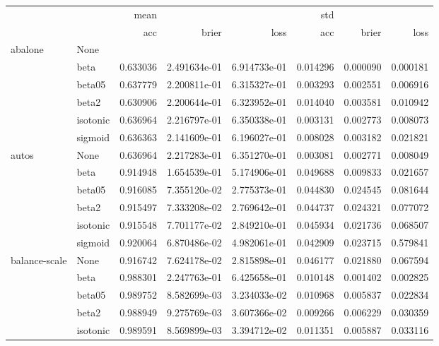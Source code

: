 \begin{tabular}{llrrrrrr}
\toprule
        &      &      mean &               &               &       std &           &           \\
        &      &       acc &         brier &          loss &       acc &     brier &      loss \\
\midrule
abalone & None &           &               &               &           &           &           \\
        & beta &  0.633036 &  2.491634e-01 &  6.914733e-01 &  0.014296 &  0.000090 &  0.000181 \\
        & beta05 &  0.637779 &  2.200811e-01 &  6.315327e-01 &  0.003293 &  0.002551 &  0.006916 \\
        & beta2 &  0.630906 &  2.200644e-01 &  6.323952e-01 &  0.014040 &  0.003581 &  0.010942 \\
        & isotonic &  0.636964 &  2.216797e-01 &  6.350338e-01 &  0.003131 &  0.002773 &  0.008073 \\
        & sigmoid &  0.636363 &  2.141609e-01 &  6.196027e-01 &  0.008028 &  0.003182 &  0.021821 \\
autos & None &  0.636964 &  2.217283e-01 &  6.351270e-01 &  0.003081 &  0.002771 &  0.008049 \\
        & beta &  0.914948 &  1.654539e-01 &  5.174906e-01 &  0.049688 &  0.009833 &  0.021657 \\
        & beta05 &  0.916085 &  7.355120e-02 &  2.775373e-01 &  0.044830 &  0.024545 &  0.081644 \\
        & beta2 &  0.915497 &  7.333208e-02 &  2.769642e-01 &  0.044737 &  0.024321 &  0.077072 \\
        & isotonic &  0.915548 &  7.701177e-02 &  2.849210e-01 &  0.045934 &  0.021736 &  0.068507 \\
        & sigmoid &  0.920064 &  6.870486e-02 &  4.982061e-01 &  0.042909 &  0.023715 &  0.579841 \\
balance-scale & None &  0.916742 &  7.624178e-02 &  2.815898e-01 &  0.046177 &  0.021880 &  0.067594 \\
        & beta &  0.988301 &  2.247763e-01 &  6.425658e-01 &  0.010148 &  0.001402 &  0.002825 \\
        & beta05 &  0.989752 &  8.582699e-03 &  3.234033e-02 &  0.010968 &  0.005837 &  0.022834 \\
        & beta2 &  0.988949 &  9.275769e-03 &  3.607366e-02 &  0.009266 &  0.006229 &  0.030359 \\
        & isotonic &  0.989591 &  8.569899e-03 &  3.394712e-02 &  0.011351 &  0.005887 &  0.033116 \\

\end{tabular}

